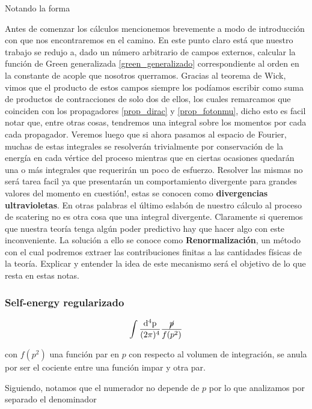\documentclass{article}
\numberwithin{equation}{section}
\begin{document}
Notando la forma

Antes de comenzar los cálculos mencionemos brevemente a modo de introducción con que nos encontraremos en el camino. En este punto claro está que nuestro trabajo se redujo a, dado un número arbitrario de campos externos, calcular la función de Green generalizada \ref{green_generalizado} correspondiente al orden en la constante de acople que nosotros querramos. Gracias al teorema de Wick, vimos que el producto de estos campos siempre los podíamos escribir como suma de productos de contracciones de solo dos de ellos, los cuales remarcamos que coinciden con los propagadores \ref{prop_dirac} y \ref{prop_fotonmu}, dicho esto es facil notar que, entre otras cosas, tendremos una integral sobre los momentos por cada cada propagador. Veremos luego que si ahora pasamos al espacio de Fourier, muchas de estas integrales se resolverán trivialmente por conservación de la energía en cada vértice del proceso mientras que en ciertas ocasiones quedarán una o más integrales que requerirán un poco de esfuerzo. Resolver las mismas no será tarea facil ya que presentarán un comportamiento divergente para grandes valores del momento en cuestión!, estas se conocen como \textbf{divergencias ultravioletas}. En otras palabras el último eslabón de nuestro cálculo al proceso de scatering no es otra cosa que una integral divergente. Claramente si queremos que nuestra teoría tenga algún poder predictivo hay que hacer algo con este inconveniente. La solución a ello se conoce como \textbf{Renormalización}, un método con el cual podremos extraer las contribuciones finitas a las cantidades físicas de la teoría. Explicar y entender la idea de este mecanismo será el objetivo de lo que resta en estas notas.

\subsubsection{Self-energy regularizado}



\begin{equation}\label{key}
\int\frac{\mathrm{\mathrm{d^4}p}}{(2\pi)^{4}} \frac{\cancel{p}}{f(p^2)}
\end{equation}

con $ f(p^2) $ una función par en $ p $ con respecto al volumen de integración, se anula por ser el cociente entre una función impar y otra par. 

Siguiendo, notamos que el numerador no depende de $ p $ por lo que analizamos por separado el denominador
\end{document}
